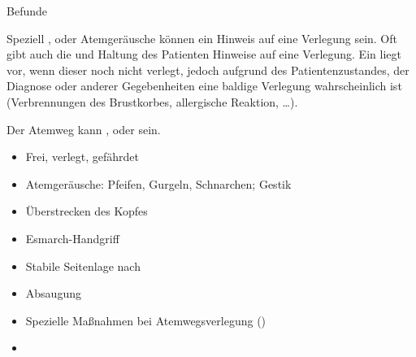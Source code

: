 \TextSlide
{{\eye} Befunde}
{Speziell ,  oder 
Atemgeräusche können ein Hinweis auf eine Verlegung sein.
Oft gibt auch die  und Haltung des Patienten
Hinweise auf eine Verlegung. 
Ein  liegt vor, wenn dieser noch nicht
verlegt, jedoch aufgrund des Patientenzustandes, der
Diagnose oder anderer Gegebenheiten eine baldige Verlegung
wahrscheinlich ist (Verbrennungen des Brustkorbes, allergische Reaktion, \ldots).

Der Atemweg kann ,
 oder  sein.
}
{
\begin{itemize}
  \item Frei, verlegt, gefährdet
  \item Atemgeräusche: Pfeifen, Gurgeln, Schnarchen;
  Gestik
\end{itemize}
}
{}
{}
{}



{%
\begin{itemize}
  \item Überstrecken des Kopfes
  \item Esmarch-Handgriff
  \item Stabile Seitenlage nach 
  \item Absaugung
  \item Spezielle Maßnahmen bei Atemwegsverlegung ()
  \item \TxMassVit 
\end{itemize}
}

